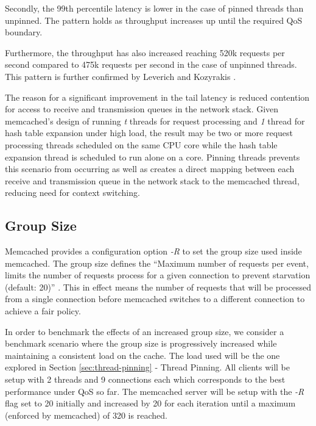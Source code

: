 Secondly, the 99th percentile latency is lower in the case of pinned threads than unpinned. The pattern holds as throughput increases up until the required QoS boundary.

Furthermore, the throughput has also increased reaching 520k requests per second compared to 475k requests per second in the case of unpinned threads. This pattern is further confirmed by  Leverich and Kozyrakis \cite{leverich2014reconciling}.

The reason for a significant improvement in the tail latency is reduced contention for access to receive and transmission queues in the network stack. Given memcached's design of running \textit{t} threads for request processing and \textit{1} thread for hash table expansion under high load, the result may be two or more request processing threads scheduled on the same CPU core while the hash table expansion thread is scheduled to run alone on a core. Pinning threads prevents this scenario from occurring as well as creates a direct mapping between each receive and transmission queue in the network stack to the memcached thread, reducing need for context switching.


\subsection{Group Size}
Memcached provides a configuration option \textit{-R} to set the group size used inside memcached. The group size defines the ``Maximum number of requests per event, limits the number of requests process for a given connection to prevent starvation (default: 20)'' \cite{interactive2006memcached}. This in effect means the number of requests that will be processed from a single connection before memcached switches to a different connection to achieve a fair policy.

In order to benchmark the effects of an increased group size, we consider a benchmark scenario where the group size is progressively increased while maintaining a consistent load on the cache. The load used will be the one explored in Section \ref{sec:thread-pinning} - Thread Pinning. All clients will be setup with 2 threads and 9 connections each which corresponds to the best performance under QoS so far. The memcached server will be setup with the \textit{-R} flag set to 20 initially and increased by 20 for each iteration until a maximum (enforced by memcached) of 320 is reached.

